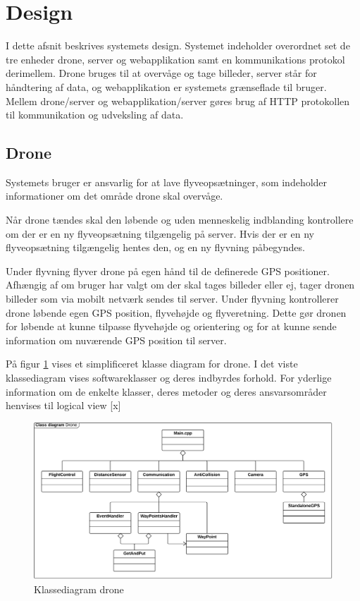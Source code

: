 \section{Design}

I dette afsnit beskrives systemets design. Systemet indeholder overordnet set de tre enheder drone, server og webapplikation samt en kommunikations protokol derimellem. Drone bruges til at overvåge og tage billeder, server står for håndtering af data, og webapplikation er systemets grænseflade til bruger. Mellem drone/server og webapplikation/server gøres brug af HTTP protokollen til kommunikation og udveksling af data.



\subsection{Drone}

Systemets bruger er ansvarlig for at lave flyveopsætninger, som indeholder informationer om det område drone skal overvåge.

Når drone tændes skal den løbende og uden menneskelig indblanding kontrollere om der er en ny flyveopsætning tilgængelig på server. Hvis der er en ny flyveopsætning tilgængelig hentes den, og en ny flyvning påbegyndes. 

Under flyvning flyver drone på egen hånd til de definerede GPS positioner. Afhængig af om bruger har valgt om der skal tages billeder eller ej, tager dronen billeder som via mobilt netværk sendes til server. 
Under flyvning kontrollerer drone løbende egen GPS position, flyvehøjde og flyveretning. Dette gør dronen for løbende at kunne tilpasse flyvehøjde og orientering og for at kunne sende information om nuværende GPS position til server.

På figur \ref{fig:class_drone} vises et simplificeret klasse diagram for drone. I det viste klassediagram vises softwareklasser og deres indbyrdes forhold. For yderlige information om de enkelte klasser, deres metoder og deres ansvarsområder henvises til logical view [x]

\begin{figure}[H]
\centering
\includegraphics[width=1\textwidth]{Billeder/Design_Class_drone.png}
\vspace{-0.5cm}
\caption{Klassediagram drone}
\label{fig:class_drone}
\end{figure}


